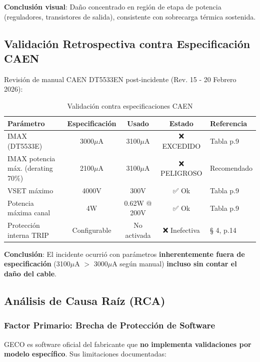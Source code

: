 \documentclass{article}
\begin{document}
\textbf{Conclusión visual}: Daño concentrado en región de etapa de potencia (reguladores, transistores de salida), consistente con sobrecarga térmica sostenida.

\subsection{Validación Retrospectiva contra Especificación CAEN}

Revisión de manual CAEN DT5533EN post-incidente (Rev. 15 - 20 Febrero 2026):

\begin{table}[h]
    \centering
    \begin{tabular}{|l|c|c|c|l|}
        \hline
        \textbf{Parámetro} & \textbf{Especificación} & \textbf{Usado} & \textbf{Estado} & \textbf{Referencia} \\
        \hline
        \hline
        IMAX (DT5533E) & 3000\(\mu\)A & 3100\(\mu\)A & ❌ EXCEDIDO & Tabla p.9 \\
        IMAX potencia máx. (derating 70\%) & 2100\(\mu\)A & 3100\(\mu\)A & ❌ PELIGROSO & Recomendado \\
        VSET máximo & 4000V & 300V & ✅ Ok & Tabla p.9 \\
        Potencia máxima canal & 4W & 0.62W @ 200V & ✅ Ok & Tabla p.9 \\
        Protección interna TRIP & Configurable & No activada & ❌ Inefectiva & § 4, p.14 \\
        \hline
    \end{tabular}
    \caption{Validación contra especificaciones CAEN}
\end{table}

\textbf{Conclusión}: El incidente ocurrió con parámetros \textbf{inherentemente fuera de especificación} (3100\(\mu\)A $>$ 3000\(\mu\)A según manual) \textbf{incluso sin contar el daño del cable}.

\subsection{Análisis de Causa Raíz (RCA)}

\subsubsection{Factor Primario: Brecha de Protección de Software}

GECO es software oficial del fabricante que \textbf{no implementa validaciones por modelo específico}. Sus limitaciones documentadas:
\end{document}
